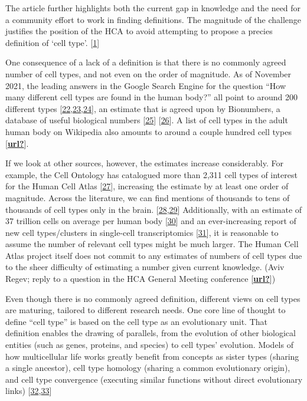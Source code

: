 The article further highlights both the current gap in knowledge and the need for a community effort to work in finding definitions.
The magnitude of the challenge justifies the position of the HCA to avoid attempting to propose a precies definition of `cell type'. {[}\protect\hyperlink{ref-1GmbExweg}{1}{]}

One consequence of a lack of a definition is that there is no commonly agreed number of cell types, and not even on the order of magnitude.
As of November 2021, the leading answers in the Google Search Engine for the question ``How many different cell types are found in the human body?'' all point to around 200 different types {[}\protect\hyperlink{ref-V85zvNGa}{22},\protect\hyperlink{ref-SKmDXJlO}{23},\protect\hyperlink{ref-WBDY0Uoy}{24}{]}, an estimate that is agreed upon by Bionumbers, a database of useful biological numbers {[}\protect\hyperlink{ref-SprCx2w6}{25}{]} {[}\protect\hyperlink{ref-jePJgR0H}{26}{]}.
A list of cell types in the adult human body on Wikipedia also amounts to around a couple hundred cell types {[}\protect\hyperlink{ref-url}{\textbf{url?}}{]}.

If we look at other sources, however, the estimates increase considerably.
For example, the Cell Ontology has catalogued more than 2,311 cell types of interest for the Human Cell Atlas {[}\protect\hyperlink{ref-J5X2Xu6M}{27}{]}, increasing the estimate by at least one order of magnitude.
Across the literature, we can find mentions of thousands to tens of thousands of cell types only in the brain. {[}\protect\hyperlink{ref-15efKvxi0}{28},\protect\hyperlink{ref-wvN4dtjQ}{29}{]}
Additionally, with an estimate of 37 trillion cells on average per human body {[}\protect\hyperlink{ref-xWhvkd3B}{30}{]} and an ever-increasing report of new cell types/clusters in single-cell transcriptomics {[}\protect\hyperlink{ref-HFiosSKK}{31}{]}, it is reasonable to assume the number of relevant cell types might be much larger.
The Human Cell Atlas project itself does not commit to any estimates of numbers of cell types due to the sheer difficulty of estimating a number given current knowledge. (Aviv Regev; reply to a question in the HCA General Meeting conference {[}\protect\hyperlink{ref-url}{\textbf{url?}}{]})

Even though there is no commonly agreed definition, different views on cell types are maturing, tailored to different research needs.
One core line of thought to define ``cell type'' is based on the cell type as an evolutionary unit.
That definition enables the drawing of parallels, from the evolution of other biological entities (such as genes, proteins, and species) to cell types' evolution.
Models of how multicellular life works greatly benefit from concepts as sister types (sharing a single ancestor), cell type homology (sharing a common evolutionary origin), and cell type convergence (executing similar functions without direct evolutionary links) {[}\protect\hyperlink{ref-O95WN4x0}{32},\protect\hyperlink{ref-ogAGO9KH}{33}{]}


